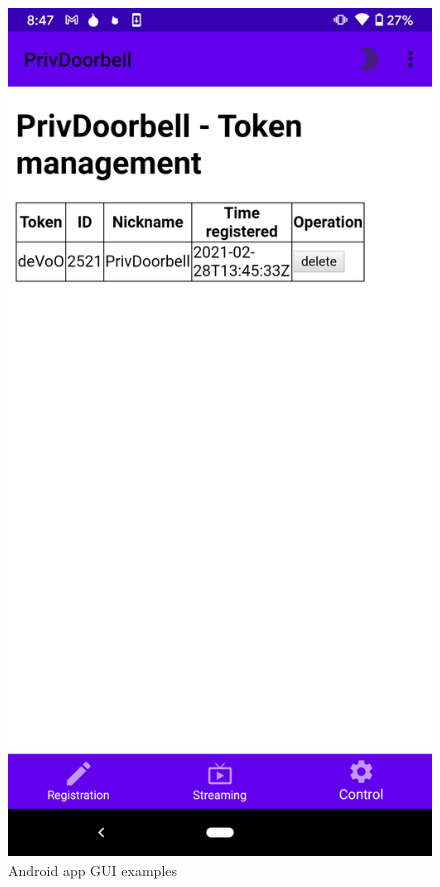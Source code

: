 \begin{figure}
\begin{minipage}[t]{0.3\linewidth}
		\includegraphics[width=\linewidth]{app_sc_token_revoke.png}
	\end{minipage}	
	\caption{Android app GUI examples}
	\label{fig:app_sc}
\end{figure}


